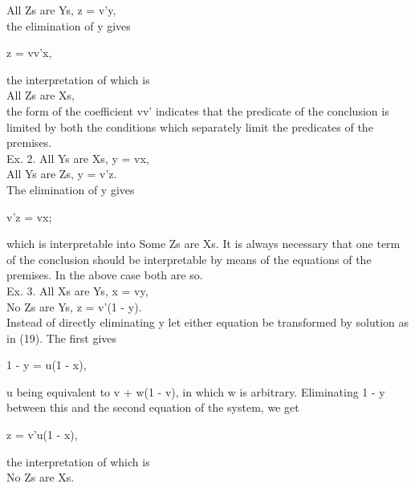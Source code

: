 \documentclass{article}
\begin{document}
{{{{\hspace*{.4in} All Zs are Ys, z = v'y,\\
the elimination of y gives\\
\begin{center} z = vv'x, \end{center}
the interpretation of which is\vspace{.1in}\\
\hspace*{.2in} All Zs are Xs,\\
the form of the coefficient vv' indicates that the predicate of the conclusion
is limited by both the conditions which separately limit the predicates of the
premises.\vspace{.1in}\\
\hspace*{.2in} Ex. 2. All Ys are Xs, y = vx,\\
\hspace*{.5in}All Ys are Zs, y = v'z.\vspace{.1in}\\
The elimination of y gives
\begin{center} v'z = vx; \end{center}
which is interpretable into Some Zs are Xs. It is always necessary that one
term of the conclusion should be interpretable by means of the equations of the
premises. In the above case both are so.\vspace{.2in}\\
\hspace*{.2in} Ex. 3. All Xs are Ys, x = vy,\vspace{.1in}\\
\hspace*{.2in} No Zs are Ys, z = v'(1 - y).\vspace{.1in}\\ 
Instead of directly eliminating y let either equation be transformed by solution
as in (19). The first gives
\begin{center} 1 - y = u(1 - x), \end{center}
u being equivalent to v + w(1 - v), in which w is arbitrary. Eliminating 1 - y
between this and the second equation of the system, we get
\begin{center} z = v'u(1 - x), \end{center}
the interpretation of which is\vspace{.1in}\\
\hspace*{.2in} No Zs are Xs.\vspace{.1in}\\
}}}}
\end{document}
